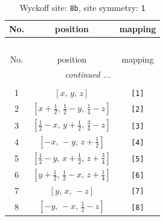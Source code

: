 \documentclass[fleqn,8pt]{jsarticle}
\begin{document}
\begin{longtable}{ccc}
\caption{Wyckoff site: {\tt 8b}, site symmetry: {\tt 1}}
 \\
 \hline \hline
No. & position & mapping \\ \hline \endfirsthead

\multicolumn{2}{l}{\tablename\ \thetable{}} \\
 \hline \hline
No. & position & mapping \\ \hline \endhead

 \hline \hline
\multicolumn{2}{r}{\footnotesize\it continued ...} \\ \endfoot

 \hline \hline
\multicolumn{2}{r}{} \\ \endlastfoot

1 & $\left[ x,\, y,\, z \right]$ & {\tt [1]} \\ \hline
2 & $\left[ x + \frac{1}{2},\, \frac{1}{2} - y,\, \frac{1}{4} - z \right]$ & {\tt [2]} \\ \hline
3 & $\left[ \frac{1}{2} - x,\, y + \frac{1}{2},\, \frac{3}{4} - z \right]$ & {\tt [3]} \\ \hline
4 & $\left[ - x,\, - y,\, z + \frac{1}{2} \right]$ & {\tt [4]} \\ \hline
5 & $\left[ \frac{1}{2} - y,\, x + \frac{1}{2},\, z + \frac{3}{4} \right]$ & {\tt [5]} \\ \hline
6 & $\left[ y + \frac{1}{2},\, \frac{1}{2} - x,\, z + \frac{1}{4} \right]$ & {\tt [6]} \\ \hline
7 & $\left[ y,\, x,\, - z \right]$ & {\tt [7]} \\ \hline
8 & $\left[ - y,\, - x,\, \frac{1}{2} - z \right]$ & {\tt [8]} \\
\end{longtable}
\end{document}
